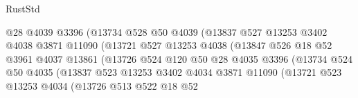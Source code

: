 \begin{lexlean}{RustStd}
\begin{coremodule}
                                    @28
                                    @4039
                                    @3396
                                    (@13734
                                      @528
                                      @50
                                      @4039
                                      (@13837
                                        @527
                                        @13253
                                        @3402
                                        @4038
                                        @3871
                                        @11090
                                        (@13721
                                          @527
                                          @13253
                                          @4038
                                          (@13847
                                            @526
                                            @18
                                            @52
                                            @3961
                                            @4037
                                            @13861
                                            (@13726
                                              @524
                                              @120
                                              @50
                                              @28
                                              @4035
                                              @3396
                                              (@13734
                                                @524
                                                @50
                                                @4035
                                                (@13837
                                                  @523
                                                  @13253
                                                  @3402
                                                  @4034
                                                  @3871
                                                  @11090
                                                  (@13721
                                                    @523
                                                    @13253
                                                    @4034
                                                    (@13726
                                                      @513
                                                      @522
                                                      @18
                                                      @52

\end{coremodule}
\end{lexlean}

